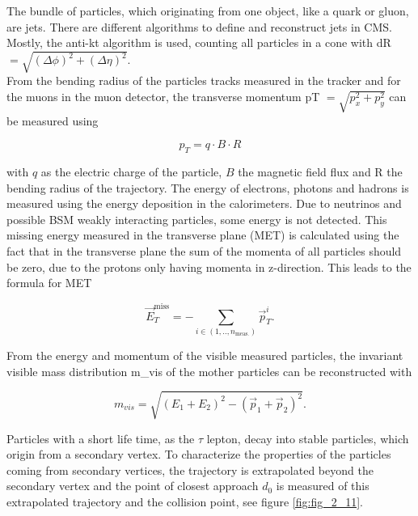 The bundle of particles, which originating from one object, like a quark or gluon, are jets. There are different algorithms to define and reconstruct jets in \gls{CMS}. Mostly, the anti-kt algorithm is used, counting all particles in a cone with \gls{dR} $= \sqrt{(\Delta \phi)^{2} + (\Delta \eta)^{2}}$.\\ 

From the bending radius of the particles tracks measured in the tracker and for the muons in the muon detector, the transverse momentum \gls{pT} $= \sqrt{p_{x}^{2} + p_{y}^{2}}$ can be measured using 

\begin{equation}
	\label{eq:eq_2_5}
	p_{T} = q\cdot B \cdot R
\end{equation} 

with $q$ as the electric charge of the particle, $B$ the magnetic field flux and R the bending radius of the trajectory. The energy of electrons, photons and hadrons is measured using the energy deposition in the calorimeters. Due to neutrinos and possible \gls{BSM} weakly interacting particles, some energy is not detected. This missing energy measured in the transverse plane (\gls{MET}) is calculated using the fact that in the transverse plane the sum of the momenta of all particles should be zero, due to the protons only having momenta in z-direction. This leads to the formula for \gls{MET}

\begin{equation}
	\label{eq:eq_2_6}
	\vec{E}_{T}^{\text{miss}} = - \sum_{i \in (1, .., n_{\text{meas.}})} \vec{p}_{T}^{i}.
\end{equation}

From the energy and momentum of the visible measured particles, the invariant visible mass distribution \gls{m_vis} of the mother particles can be reconstructed with 

\begin{equation}
	\label{eq:eq_2_6}
	m_{vis} = \sqrt{(E_{1} + E_{2})^2 - (\vec{p}_{1} + \vec{p}_{2})^2}.
\end{equation}


Particles with a short life time, as the $\tau$ lepton, decay into stable particles, which origin from a secondary vertex. To characterize the properties of the particles coming from secondary vertices, the trajectory is extrapolated beyond the secondary vertex and the point of closest approach $d_{0}$ is measured of this extrapolated trajectory and the collision point, see figure \ref{fig:fig_2_11}.


